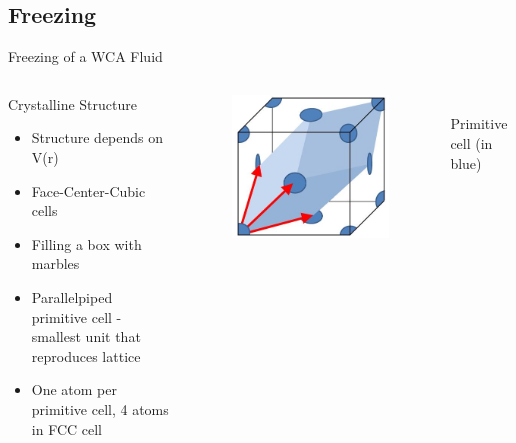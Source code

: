 \documentclass{beamer}
\begin{document}
\subsection*{Freezing}
\begin{frame}{Freezing of a WCA Fluid}
	\begin{columns}[t]
	    \vspace{-1em}
		\begin{block}{Crystalline Structure}
			\begin{itemize}
			    \item Structure depends on V(r)
				\item Face-Center-Cubic cells 
				\item Filling a box with marbles
				\item Parallelpiped primitive cell - 
				smallest unit that reproduces lattice
				\item One atom per primitive cell, 4 atoms in FCC cell
			\end{itemize}
		\end{block}
        \vspace{-0.5em}
        \begin{figure}
            \centering
            \includegraphics[width=0.6
            \columnwidth]{PrimitiveCellLightBlue.png}
          \end{figure}
          
          $~~~~~~~$Primitive cell (in blue)
	\end{columns}	
\end{frame}
\end{document}

